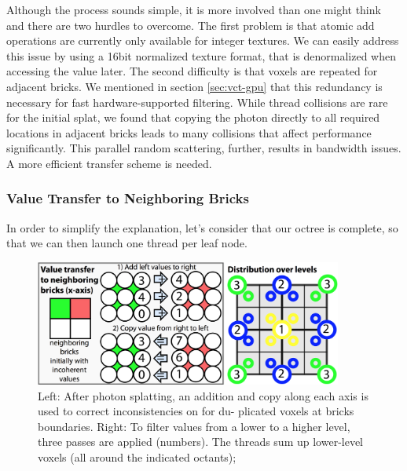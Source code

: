 Although the process sounds simple, it is more involved than one might think and there are two hurdles to overcome. The first problem is that atomic add operations are currently only available for integer textures. We can easily address this issue by using a 16bit normalized texture format, that is denormalized when accessing the value later. The second difficulty is that voxels are repeated for adjacent bricks. We mentioned in section \ref{sec:vct-gpu} that this redundancy is necessary for fast hardware-supported filtering. While thread collisions are rare for the initial splat, we found that copying the photon directly to all required locations in adjacent bricks leads to many collisions that affect performance significantly. This parallel random scattering, further, results in bandwidth issues. A more efficient transfer scheme is needed.




\subsubsection{Value Transfer to Neighboring Bricks}
In order to simplify the explanation, let's consider that our octree is complete, so that we can then launch one thread per leaf node.

\begin{figure}\label{f:vct-value-transfer}
	\begin{center}
		\includegraphics[width=0.9\textwidth]{graphics/vct/vct-14-4}
	\end{center}
	\caption{Left: After photon splatting, an addition and copy along each axis is used to correct inconsistencies on for du- plicated voxels at bricks boundaries. Right: To filter values from a lower to a higher level, three passes are applied (numbers). The threads sum up lower-level voxels (all around the indicated octants);}
\end{figure} 

